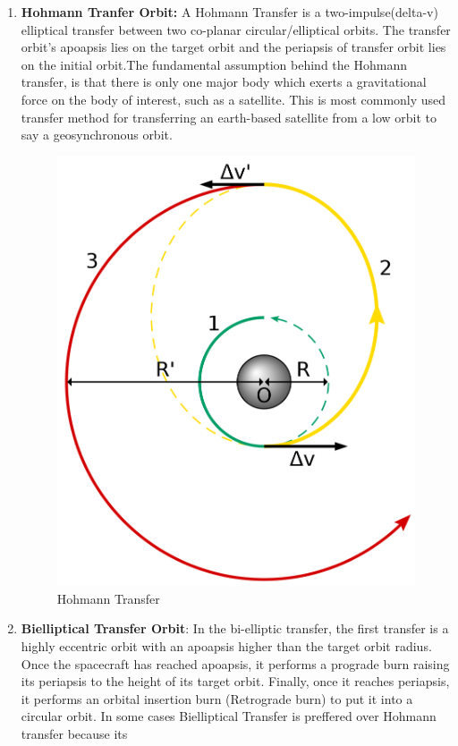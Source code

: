 \begin{enumerate}
\item \textbf{Hohmann Tranfer Orbit: }A Hohmann Transfer is a two-impulse(delta-v) elliptical transfer between two co-planar circular/elliptical orbits. The transfer orbit's apoapsis lies on the target orbit and the periapsis of transfer orbit lies on the initial orbit.The fundamental assumption behind the Hohmann transfer, is that there is only one major body which exerts a gravitational force on the body of interest, such as a satellite. This is most commonly used transfer method for transferring an earth-based satellite from a low orbit to say a geosynchronous orbit.
\begin{figure}[H]
\includegraphics[scale=0.1]{images/ht.png}
\caption{Hohmann Transfer}
\end{figure}
\item \textbf{Bielliptical Transfer Orbit}: In the bi-elliptic transfer, the first transfer is a highly eccentric orbit with an apoapsis higher than the target orbit radius. Once the spacecraft has reached apoapsis, it performs a prograde burn raising its periapsis to the height of its target orbit. Finally, once it reaches periapsis, it performs an orbital insertion burn (Retrograde burn) to put it into a circular orbit. In some cases Bielliptical Transfer is preffered over Hohmann transfer because its

\end{enumerate}
